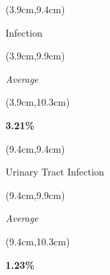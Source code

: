 \documentclass[
  11pt,
  landscape]{article}
\begin{document}

\begin{textblock*}{5cm}(3.9cm,9.4cm) %
    \centerline{\small{Infection}}
\end{textblock*}

\begin{textblock*}{5cm}(3.9cm,9.9cm) %
    \small \centerline{\textit{Average}}
\end{textblock*}

\begin{textblock*}{5cm}(3.9cm,10.3cm) %
    \centerline{\textbf{3.21\%}}
\end{textblock*}

\begin{textblock*}{5cm}(9.4cm,9.4cm) %
    \centerline{\small{Urinary Tract Infection}}
\end{textblock*}

\begin{textblock*}{5cm}(9.4cm,9.9cm) %
    \small \centerline{\textit{Average}}
\end{textblock*}

\begin{textblock*}{5cm}(9.4cm,10.3cm) %
    \centerline{\textbf{1.23\%}}
\end{textblock*}
\end{document}
